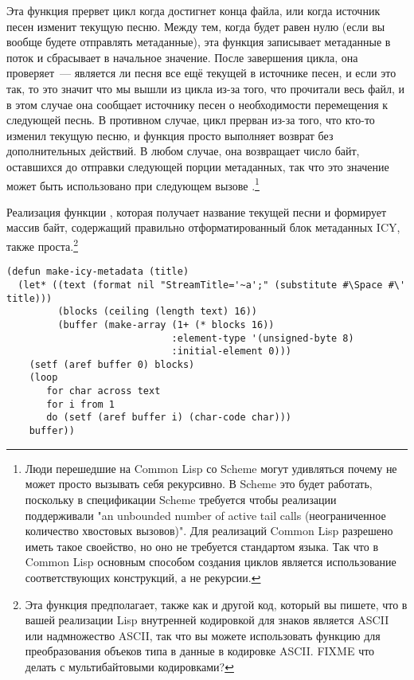 Эта функция прервет цикл когда достигнет конца файла, или когда источник песен изменит
текущую песню.  Между тем, когда  будет равен нулю (если вы вообще
будете отправлять метаданные), эта функция записывает метаданные в поток и сбрасывает
 в начальное значение.  После завершения цикла, она проверяет~---
является ли песня все ещё текущей в источнике песен, и если это так, то это значит что мы
вышли из цикла из-за того, что прочитали весь файл, и в этом случае она сообщает источнику
песен о необходимости перемещения к следующей песнь.  В противном случае, цикл прерван
из-за того, что кто-то изменил текущую песню, и функция просто выполняет возврат без
дополнительных действий.  В любом случае, она возвращает число байт, оставшихся до
отправки следующей порции метаданных, так что это значение может быть использовано при
следующем вызове .\footnote{Люди перешедшие на Common Lisp со Scheme
  могут удивляться почему  не может просто вызывать себя рекурсивно.  В
  Scheme это будет работать, поскольку в спецификации Scheme требуется чтобы реализации
  поддерживали "an unbounded number of active tail calls (неограниченное количество
  хвостовых вызовов)".  Для реализаций Common Lisp разрешено иметь такое своейство, но оно
  не требуется стандартом языка.  Так что в Common Lisp основным способом создания циклов
  является использование соответствующих конструкций, а не рекурсии.}

Реализация функции , которая получает название текущей песни и
формирует массив байт, содержащий правильно отформатированный блок метаданных ICY, также
проста.\footnote{Эта функция предполагает, также как и другой код, который вы пишете, что
  в вашей реализации Lisp внутренней кодировкой для знаков является ASCII или надмножество
  ASCII, так что вы можете использовать функцию  для преобразования
  объеков типа  в данные в кодировке ASCII. FIXME что делать с
  мультибайтовыми кодировками?}

\begin{lstlisting}
(defun make-icy-metadata (title)
  (let* ((text (format nil "StreamTitle='~a';" (substitute #\Space #\' title)))
         (blocks (ceiling (length text) 16))
         (buffer (make-array (1+ (* blocks 16))
                             :element-type '(unsigned-byte 8)
                             :initial-element 0)))
    (setf (aref buffer 0) blocks)
    (loop 
       for char across text
       for i from 1 
       do (setf (aref buffer i) (char-code char)))
    buffer))
\end{lstlisting}

